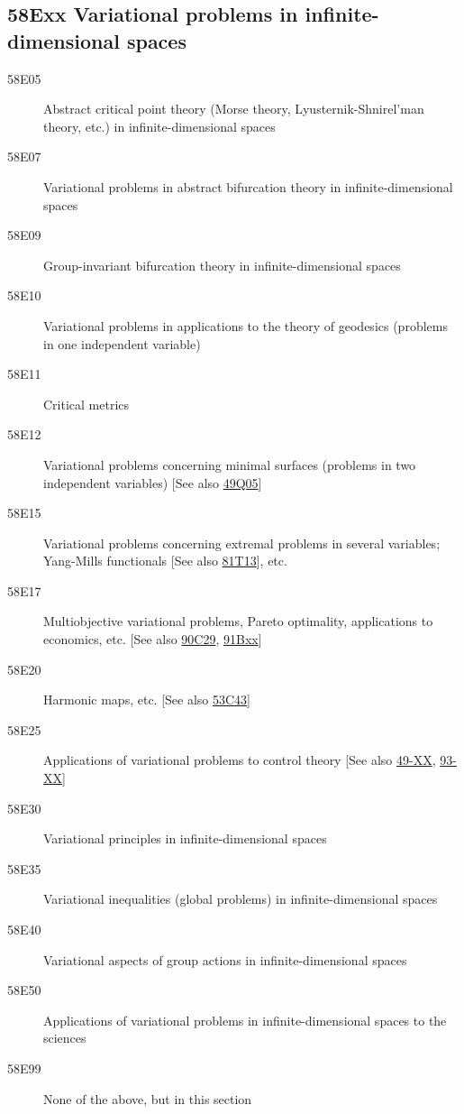 \documentclass[letterpaper]{article}
\begin{document}
\subsection*{58Exx  Variational problems in infinite-dimensional spaces }\label{58Exx}
\begin{description}  
\item [58E05]\label{58E05} Abstract critical point theory (Morse theory, Lyusternik-Shnirel'man theory, etc.) in infinite-dimensional spaces
\item [58E07]\label{58E07} Variational problems in abstract bifurcation theory in infinite-dimensional spaces
\item [58E09]\label{58E09} Group-invariant bifurcation theory in infinite-dimensional spaces
\item [58E10]\label{58E10} Variational problems in applications to the theory of geodesics (problems in one independent variable) 
\item [58E11]\label{58E11} Critical metrics
\item [58E12]\label{58E12} Variational problems concerning minimal surfaces (problems in two independent variables) [See also \hyperref[49Q05]{49Q05}]
\item [58E15]\label{58E15} Variational problems concerning extremal problems in several variables; Yang-Mills functionals [See also \hyperref[81T13]{81T13}], etc.
\item [58E17]\label{58E17} Multiobjective variational problems, Pareto optimality, applications to economics, etc. [See also \hyperref[90C29]{90C29}, \hyperref[91Bxx]{91Bxx}]
\item [58E20]\label{58E20} Harmonic maps, etc. [See also \hyperref[53C43]{53C43}]
\item [58E25]\label{58E25} Applications of variational problems to control theory [See also \hyperref[49-XX]{49-XX}, \hyperref[93-XX]{93-XX}]
\item [58E30]\label{58E30} Variational principles in infinite-dimensional spaces
\item [58E35]\label{58E35} Variational inequalities (global problems) in infinite-dimensional spaces
\item [58E40]\label{58E40} Variational  aspects of group actions in infinite-dimensional spaces
\item [58E50]\label{58E50} Applications of variational problems in infinite-dimensional spaces to the sciences
\item [58E99]\label{58E99} None of the above, but in this section
\end{description}
\end{document}
